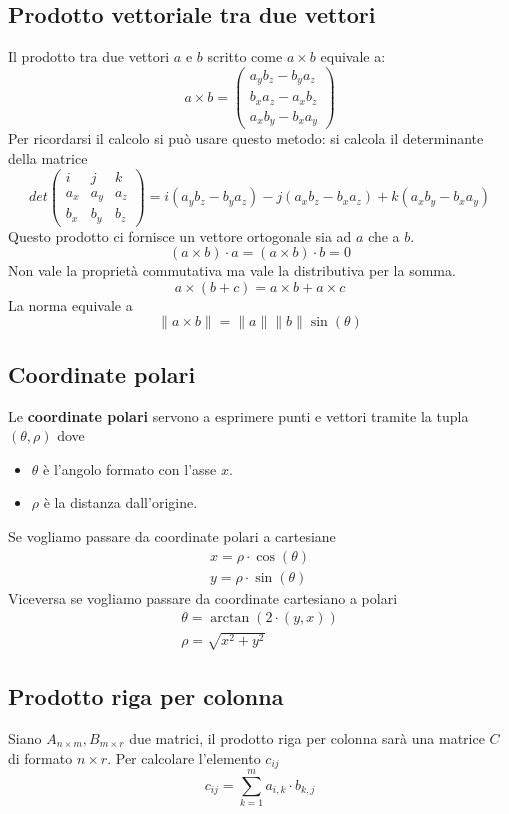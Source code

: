 \subsection{Prodotto vettoriale tra due vettori}
Il prodotto tra due vettori $a$ e $b$ scritto come $a \times b$ equivale a:
\[
	a \times b = \begin{pmatrix}
		a_y b_z - b_y a_z \\ b_x a_z - a_x b_z \\ a_x b_y - b_x a_y
	\end{pmatrix}
\]
Per ricordarsi il calcolo si pu\`o usare questo metodo: si calcola il determinante della
matrice
\[
	det \begin{pmatrix}
		i   & j   & k   \\
		a_x & a_y & a_z \\
		b_x & b_y & b_z
	\end{pmatrix} =
	i(a_y b_z - b_y a_z) - j(a_x b_z - b_x a_z) + k(a_x b_y - b_x a_y)
\]
Questo prodotto ci fornisce un vettore ortogonale sia ad $a$ che a $b$.
\[ (a \times b) \cdot a = (a \times b ) \cdot b = 0 \]
Non vale la propriet\`a commutativa ma vale la distributiva per la somma.
\[ a \times (b + c) = a \times b + a \times c \]
La norma equivale a
\[ \| a \times b \| = \| a \| \| b \| \sin(\theta) \]

\subsection{Coordinate polari}
Le \textbf{coordinate polari} servono a esprimere punti e vettori tramite la tupla
$(\theta, \rho)$ dove
\begin{itemize}
	\item $\theta$ \`e l'angolo formato con l'asse $x$.
	\item $\rho$ \`e la distanza dall'origine.
\end{itemize}
Se vogliamo passare da coordinate polari a cartesiane
\begin{gather*}
	x = \rho \cdot \cos(\theta) \\
	y = \rho \cdot \sin(\theta)
\end{gather*}
Viceversa se vogliamo passare da coordinate cartesiano a polari
\begin{gather*}
	\theta = \arctan(2 \cdot (y, x)) \\
	\rho = \sqrt{x^2 + y^2}
\end{gather*}

\subsection{Prodotto riga per colonna}
Siano $A_{n \times m}, B_{m \times r}$ due matrici, il prodotto riga per colonna
sar\`a una matrice $C$ di formato $n \times r$. Per calcolare l'elemento $c_{ij}$
\[ c_{ij} = \sum_{k = 1}^m a_{i,k} \cdot b_{k,j} \]

